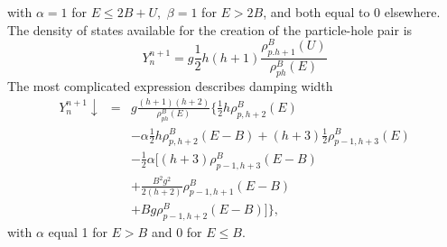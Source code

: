 \documentclass[twocolumn,amsmath,amssymb,10pt,groupedaddress,letter]{revtex4}
\begin{document}
with $\alpha=1$ for $E\leq2B+U,\,\,\beta=1$ for $E>2B$, and both
equal to 0 elsewhere. The density of states available for the creation
of the particle-hole pair is
\begin{equation}
Y_{n}^{n+1}=g\frac{1}{2}h(h+1)\frac{\rho_{p.h+1}^{B}(U)}{\rho_{ph}^{B}(E)}
\label{Yplus}
\end{equation}
The most complicated expression describes damping width
\begin{eqnarray}
Y_{n}^{n+1}\downarrow & = & g\frac{(h+1)(h+2)}{\rho_{ph}^{B}(E)}\biggl\{\frac{1}{2}h\rho_{p,h+2}^{B}(E)\nonumber\\
&&-\alpha\frac{1}{2}h\rho_{p,h+2}^{B}(E-B)+(h+3)\frac{1}{2}\rho_{p-1,h+3}^{B}(E)\nonumber \\
 &  & -\frac{1}{2}\alpha\biggl[(h+3)\rho_{p-1,h+3}^{B}(E-B)\label{Ydown}\nonumber\\
 &  & +\frac{B^{2}g^{2}}{2(h+2)}\rho_{p-1,h+1}^{B}(E-B)\nonumber \\
&& +Bg\rho_{p-1,h+2}^{B}(E-B)\biggr]\biggr\},
\end{eqnarray}
\noindent with $\alpha$ equal 1 for $E>B$ and 0 for $E\leq B$.

\medskip
\end{document}
